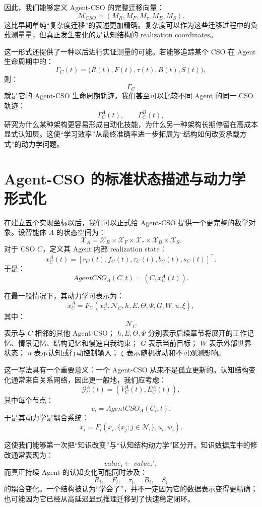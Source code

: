 因此，我们能够定义 Agent-CSO 的完整迁移向量：
\[
\boxed{
\mathcal M_{CSO}
=
\left(
M_R,
M_F,
M_\tau,
M_B,
M_S
\right).
}
\]
这比早期单纯“复杂度迁移”的表述更加精确。复杂度可以作为这些迁移过程中的负载测量量，但真正发生变化的是认知结构的 realization coordinates。

这一形式还提供了一种以后进行实证测量的可能。若能够追踪某个 CSO 在 Agent 生命周期中的：
\[
\Gamma_C(t)
=
\big(
R(t),F(t),\tau(t),B(t),S(t)
\big),
\]
则：
\[
\Gamma_C
\]
就是它的 Agent-CSO 生命周期轨迹。我们甚至可以比较不同 Agent 的同一 CSO 轨迹：
\[
\Gamma_C^A(t),
\qquad
\Gamma_C^B(t),
\]
研究为什么某种架构更容易形成自动化技能，为什么另一种架构长期停留在高成本显式认知层。这使“学习效率”从最终准确率进一步拓展为“结构如何改变承载方式”的动力学问题。

\section{Agent-CSO 的标准状态描述与动力学形式化}

在建立五个实现坐标以后，我们可以正式给 Agent-CSO 提供一个更完整的数学对象。设智能体 $A$ 的状态空间为：
\[
\mathcal X_A
=
\mathcal X_R
\times
\mathcal X_F
\times
\mathcal X_\tau
\times
\mathcal X_B
\times
\mathcal X_S.
\]
对于 CSO $C$，定义其 Agent 内部 realization state：
\[
x_C^A(t)
=
\left[
r_C(t),
f_C(t),
\tau_C(t),
b_C(t),
s_C(t)
\right]^\top.
\]
于是：
\[
AgentCSO_A(C,t)
=
(C,x_C^A(t)).
\]

在最一般情况下，其动力学可表示为：
\[
\dot x_C^A
=
F_C
\left(
x_C^A,
\mathcal N_C,
h,
E,
\Theta,
\Psi,
G,
W,
u,
\xi
\right),
\]
其中：
\[
\mathcal N_C
\]
表示与 $C$ 相邻的其他 Agent-CSO；
$h,E,\Theta,\Psi$ 分别表示后续章节将展开的工作记忆、情景记忆、结构记忆和慢速自我约束；
$G$ 表示当前目标；
$W$ 表示外部世界状态；
$u$ 表示认知或行动控制输入；
$\xi$ 表示随机扰动和不可观测影响。

这一写法具有一个重要意义：一个 Agent-CSO 从来不是孤立更新的。认知结构变化通常来自关系网络，因此更一般地，我们应考虑：
\[
\mathcal G_C^A(t)
=
\left(
V_C^A(t),
E_C^A(t)
\right),
\]
其中每个节点：
\[
v_i
=
AgentCSO_A(C_i,t).
\]
于是其动力学是耦合系统：
\[
\dot x_i
=
F_i
\left(
x_i,
\{x_j:j\in\mathcal N_i\},
u_i,
w_i
\right).
\]

这使我们能够第一次把“知识改变”与“认知结构动力学”区分开。知识数据库中的修改通常表现为：
\[
value_i
\leftarrow
value_i',
\]
而真正持续 Agent 的认知变化可能同时涉及：
\[
R_i,\quad
F_i,\quad
\tau_i,\quad
B_i,\quad
S_i
\]
的耦合变化。一个结构被认为“学会了”，并不一定因为它的数据表示变得更精确；也可能因为它已经从高延迟显式推理迁移到了快速稳定闭环。

